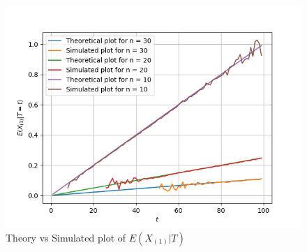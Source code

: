 \begin{figure}[!hbt]
    \centering
	\includegraphics[width=\columnwidth]{stats/solutions/6/Figures/Figure_1.png}
    \caption{Theory vs Simulated plot of $E(X_{(1)} |T)$}
    \label{CDF_Y}
\end{figure}
